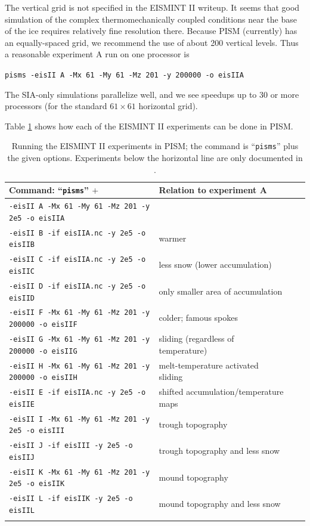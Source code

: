 \documentclass[11pt,final]{amsart}
\renewcommand{\t}[1]{\texttt{#1}}
\begin{document}
The vertical grid is not specified in the EISMINT II writeup.  It seems that good simulation of the complex thermomechanically coupled conditions near the base of the ice requires relatively fine resolution there.  Because PISM (currently) has an equally-spaced grid, we recommend the use of about 200 vertical levels.  Thus a reasonable experiment A run on one processor is

\verb|pisms -eisII A -Mx 61 -My 61 -Mz 201 -y 200000 -o eisIIA|

\noindent The SIA-only simulations parallelize well, and we see speedups up to 30 or more processors (for the standard $61\times 61$ horizontal grid).

Table \ref{tab:eisII} shows how each of the EISMINT II experiments can be done in PISM.

\begin{table}[ht]
\caption{Running the EISMINT II experiments in PISM; the command is ``\t{pisms}'' plus the given options.  Experiments below the horizontal line are only documented in \cite{EISIIdescribe}.}\label{tab:eisII}
\small
\begin{tabular}{@{}llll}\hline
\textbf{Command: ``\t{pisms}'' $+$} & \textbf{Relation to experiment A} \\ \hline
\verb|-eisII A -Mx 61 -My 61 -Mz 201 -y 2e5 -o eisIIA| & \\
\verb|-eisII B -if eisIIA.nc -y 2e5 -o eisIIB| & warmer \\
\verb|-eisII C -if eisIIA.nc -y 2e5 -o eisIIC| & less snow (lower accumulation)\\
\verb|-eisII D -if eisIIA.nc -y 2e5 -o eisIID| & only smaller area of accumulation \\
\verb|-eisII F -Mx 61 -My 61 -Mz 201 -y 200000 -o eisIIF| & colder; famous spokes \cite{BBL} \\
\verb|-eisII G -Mx 61 -My 61 -Mz 201 -y 200000 -o eisIIG| & sliding (regardless of temperature) \\
\verb|-eisII H -Mx 61 -My 61 -Mz 201 -y 200000 -o eisIIH| & melt-temperature activated sliding \\ \hline
\verb|-eisII E -if eisIIA.nc -y 2e5 -o eisIIE| & shifted accumulation/temperature maps \\
\verb|-eisII I -Mx 61 -My 61 -Mz 201 -y 2e5 -o eisIII| & trough topography \\
\verb|-eisII J -if eisIII -y 2e5 -o eisIIJ| & trough topography and less snow \\
\verb|-eisII K -Mx 61 -My 61 -Mz 201 -y 2e5 -o eisIIK| & mound topography \\
\verb|-eisII L -if eisIIK -y 2e5 -o eisIIL| & mound topography and less snow \\
\hline\normalsize
\end{tabular}\end{table}
\end{document}
